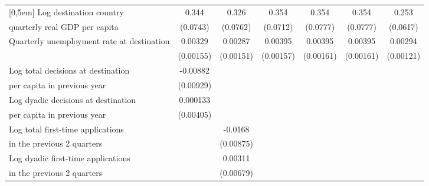 \begin{table}[!ht]
\begin{tabular}{l*{6}{c}}
[0,5em]
Log destination country &       0.344\sym{***}&       0.326\sym{***}&       0.354\sym{***}&       0.354\sym{***}&       0.354\sym{***}&       0.253\sym{***}\\
quarterly real GDP per capita                    &    (0.0743)         &    (0.0762)         &    (0.0712)         &    (0.0777)         &    (0.0777)         &    (0.0617)         \\
[0,5em]
Quarterly unemployment rate at destination&     0.00329\sym{*}  &     0.00287         &     0.00395\sym{*}  &     0.00395\sym{*}  &     0.00395\sym{*}  &     0.00294\sym{*}  \\
                    &   (0.00155)         &   (0.00151)         &   (0.00157)         &   (0.00161)         &   (0.00161)         &   (0.00121)         \\
[0,5em]
Log total decisions at destination&    -0.00882         &                     &                     &                     &                     &                     \\
 per capita in previous year                    &   (0.00929)         &                     &                     &                     &                     &                     \\
[0,5em]
Log dyadic decisions at destination &    0.000133         &                     &                     &                     &                     &                     \\
per capita in previous year                    &   (0.00405)         &                     &                     &                     &                     &                     \\
[0,5em]
Log total first-time applications &                     &     -0.0168         &                     &                     &                     &                     \\
in the previous 2 quarters                    &                     &   (0.00875)         &                     &                     &                     &                     \\
[0,5em]
Log dyadic first-time applications&                     &     0.00311         &                     &                     &                     &                     \\
 in the previous 2 quarters                    &                     &   (0.00679)         &                     &                     &                     &                     \\

\end{tabular}
\end{table}
